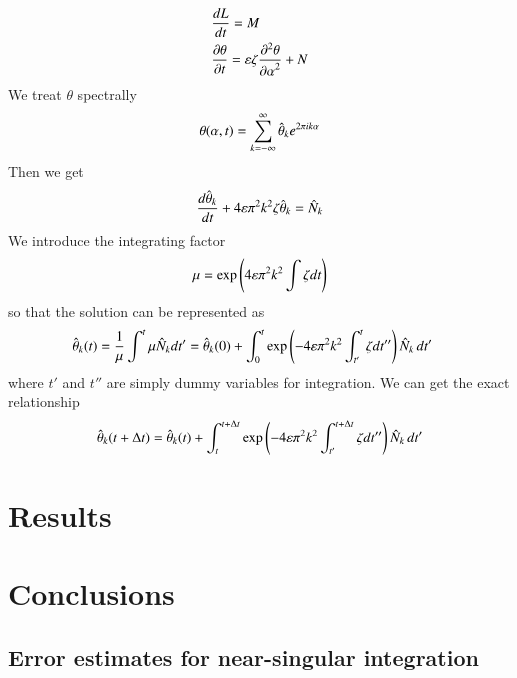 \documentclass[preprint, 10pt]{elsarticle}
\begin{document}
\begin{align}
& \frac{d L}{d t} = M \\
& \frac{\partial \theta}{\partial t} = \varepsilon \zeta \frac{\partial^2 \theta}{{\partial \alpha}^2} + N
\end{align}
We treat $\theta$ spectrally
\begin{equation}
\theta(\alpha,t) = \sum_{k = -\infty}^{\infty} \hat{\theta}_k e^{2\pi i k \alpha}
\end{equation}
Then we get
\begin{equation}
\frac{d \hat{\theta}_k}{d t} +  4 \varepsilon \pi^2 k^2  \zeta \hat{\theta}_k = \hat{N}_k
\end{equation}
We introduce the integrating factor
\begin{equation}
\mu = \exp \left( 4 \varepsilon \pi^2 k^2 \int \zeta dt \right)
\end{equation}
so that the solution can be represented as
\begin{align}
\hat{\theta}_k(t) & = \frac{1}{\mu} \int^t \mu \hat{N}_k dt'
= \hat{\theta}_k(0) + \int_0^t \exp \left( -4 \varepsilon \pi^2 k^2 \int_{t'}^t \zeta dt'' \right) \hat{N}_k \, dt'
\end{align}
where $t'$ and $t''$ are simply dummy variables for integration. We can get the exact relationship
\begin{equation}
\hat{\theta}_k(t + \Delta t) = \hat{\theta}_k(t) 
+ \int_t^{t+\Delta t} \exp \left( -4 \varepsilon \pi^2 k^2 \int_{t'}^{t+\Delta t} \zeta dt'' \right) \hat{N}_k \, dt'
\end{equation}











\section{Results\label{s:results}} 

\section{Conclusions\label{s:conclusions}}


\begin{appendices}
\section{Error estimates for near-singular integration \label{A:AppendixA}} 
\end{appendices}


 

\end{document}
